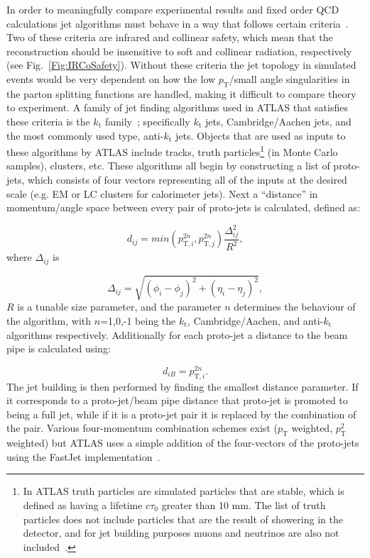 In order to meaningfully compare experimental results and fixed order QCD calculations jet algorithms must behave in a way that follows certain criteria~\cite{Blazey:2000qt}.  
Two of these criteria are infrared and collinear safety, which mean that the reconstruction should be insensitive to soft and collinear radiation, respectively (see Fig.~\ref{Fig:IRCoSafety}).  
Without these criteria the jet topology in simulated events would be very dependent on how the low $p_{\mathrm T}$/small angle singularities in the parton splitting functions are handled, making it difficult to compare theory to experiment.  
A family of jet finding algorithms used in ATLAS that satisfies these criteria is the $k_{\mathrm t}$ family~\cite{Cacciari:2008gp}; specifically $k_{\mathrm t}$ jets, Cambridge/Aachen jets, and the most commonly used type, anti-$k_{\mathrm t}$ jets.  
Objects that are used as inputs to these algorithms by ATLAS include tracks, truth particles\footnote{In ATLAS truth particles are simulated particles that are stable, which is defined as having a lifetime $c\tau _{\mathrm 0}$ greater than 10 mm.  The list of truth particles does not include particles that are the result of showering in the detector, and for jet building purposes muons and neutrinos are also not included~\cite{ATL-PHYS-PUB-2015-013}.}  (in Monte Carlo samples), clusters, etc.  
These algorithms all begin by constructing a list of proto-jets, which consists of four vectors representing all of the inputs at the desired scale (e.g. EM or LC clusters for calorimeter jets).  
Next a ``distance'' in momentum/angle space between every pair of proto-jets is calculated, defined as:

\begin{equation}
  d_{ij}=min\left(p_{\mathrm T,i}^{2n}, p_{\mathrm T,j}^{2n}\right)\frac{\Delta_{ij}^2}{R^2}, 
\end{equation}
\noindent
where $\Delta_{ij}$ is  

\begin{equation}
  \Delta_{ij} = \sqrt{ \left(\phi_i-\phi_j\right)^2+\left(\eta_i-\eta_j\right)^2}, 
\end{equation}
\noindent
$R$ is a tunable size parameter, and the parameter $n$ determines the behaviour of the algorithm, with $n$=1,0,-1 being the $k_{\mathrm t}$, Cambridge/Aachen, and anti-$k_{\mathrm t}$ algorithms respectively.  
Additionally for each proto-jet a distance to the beam pipe is calculated using:

\begin{equation}
  d_{iB} = p_{\mathrm T,i}^{2n}.
\end{equation}  
\noindent
The jet building is then performed by finding the smallest distance parameter.  
If it corresponds to a proto-jet/beam pipe distance that proto-jet is promoted to being a full jet, while if it is a proto-jet pair it is replaced by the combination of the pair.  
Various four-momentum combination schemes exist ($p_{\mathrm T}$ weighted, $p_{\mathrm T}^2$ weighted) but ATLAS uses a simple addition of the four-vectors of the proto-jets using the FastJet implementation~\cite{Cacciari:2011ma}.  

